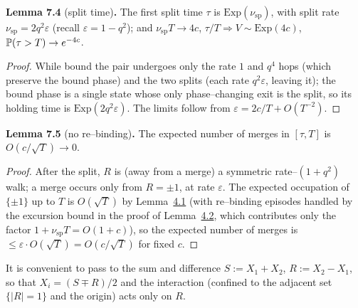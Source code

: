 \documentclass[11pt]{article}
\theoremstyle{plain}
\theoremstyle{definition}
\theoremstyle{remark}
\newcommand{\To}{\Rightarrow}\newcommand{\so}{\mathfrak{so}}
\newcommand{\eps}{\varepsilon}\newcommand{\Exp}{\mathrm{Exp}}
\begin{document}
\label{lem_split}\noindent\textbf{Lemma 7.4} (split time)\textbf{.} 
The first split time $\tau$ is $\Exp(\nu_{\mathrm{sp}})$, with split rate
$\nu_{\mathrm{sp}}=2q^2\eps$ (recall $\eps=1-q^2$); and $\nu_{\mathrm{sp}}T\to4c$,
$\tau/T\To V\sim\Exp(4c)$, $\mathbb{P}(\tau>T)\to e^{-4c}$.
\par
\begin{proof}
While bound the pair undergoes only the rate $1$ and $q^4$ hops (which preserve the
bound phase) and the two splits (each rate $q^2\eps$, leaving it); the bound phase is a
single state whose only phase--changing exit is the split, so its holding time is
$\Exp(2q^2\eps)$. The limits follow from $\eps=2c/T+O(T^{-2})$.
\end{proof}

\label{lem_rebind}\noindent\textbf{Lemma 7.5} (no re--binding)\textbf{.} 
The expected number of merges in $[\tau,T]$ is $O(c/\sqrt T)\to0$.
\par
\begin{proof}
After the split, $R$ is (away from a merge) a symmetric rate--$(1+q^2)$ walk; a merge
occurs only from $R=\pm1$, at rate $\eps$. The expected occupation of $\{\pm1\}$ up to
$T$ is $O(\sqrt T)$ by Lemma~\hyperref[lem_free]{4.1} (with re--binding episodes handled by the
excursion bound in the proof of Lemma~\hyperref[lem_Rlclt]{4.2}, which contributes only the
factor $1+\nu_{\mathrm{sp}}T=O(1+c)$), so the expected number of merges is
$\le\eps\cdot O(\sqrt T)=O(c/\sqrt T)$ for fixed $c$.
\end{proof}

It is convenient to pass to the sum and difference $S:=X_1+X_2$, $R:=X_2-X_1$, so that
$X_i=(S\mp R)/2$ and the interaction (confined to the adjacent set $\{|R|=1\}$ and the
origin) acts only on $R$.
\end{document}
